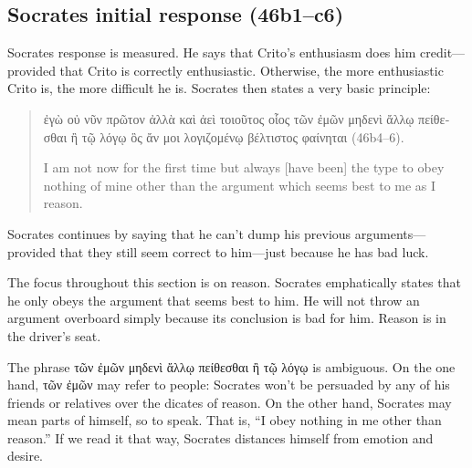 \documentclass[12pt,letterpaper]{article}
\begin{document}

\subsection*{Socrates initial response (46b1--c6)}

Socrates response is measured.
He says that Crito's enthusiasm does him credit---provided that Crito is correctly enthusiastic.
Otherwise, the more enthusiastic Crito is, the more difficult he is.
Socrates then states a very basic principle:

\begin{quote}
    \textgreek{ἐγὼ οὐ νῦν πρῶτον ἀλλὰ καὶ ἀεὶ τοιοῦτος οἷος τῶν ἐμῶν μηδενὶ ἄλλῳ πείθεσθαι ἢ τῷ λόγῳ ὃς ἄν μοι λογιζομένῳ βέλτιστος φαίνηται} (46b4--6).

    I am not now for the first time but always [have been] the type to obey nothing of mine other than the argument which seems best to me as I reason.
\end{quote}

Socrates continues by saying that he can't dump his previous arguments---provided that they still seem correct to him---just because he has bad luck.

The focus throughout this section is on reason.
Socrates emphatically states that he only obeys the argument that seems best to him.
He will not throw an argument overboard simply because its conclusion is bad for him.
Reason is in the driver's seat.

The phrase \textgreek{τῶν ἐμῶν μηδενὶ ἄλλῳ πείθεσθαι ἢ τῷ λόγῳ} is ambiguous.
On the one hand, \textgreek{τῶν ἐμῶν} may refer to people: Socrates won't be persuaded by any of his friends or relatives over the dicates of reason.
On the other hand, Socrates may mean parts of himself, so to speak.
That is, ``I obey nothing in me other than reason.''
If we read it that way, Socrates distances himself from emotion and desire. 
\end{document}
